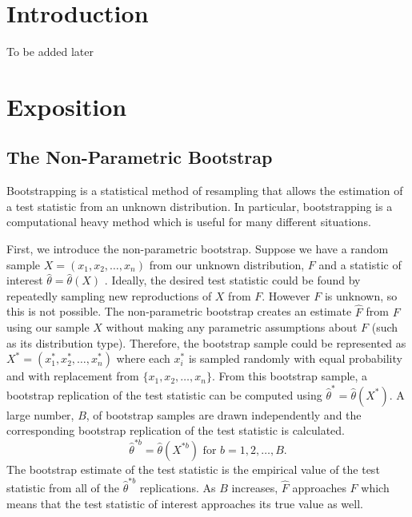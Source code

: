 \documentclass[12pt]{article}
\begin{document}
\newpage
{} %

\hypertarget{introduction}{%
\section{Introduction}\label{introduction}}

To be added later

\hypertarget{exposition}{%
\section{Exposition}\label{exposition}}

\hypertarget{the-non-parametric-bootstrap}{%
\subsection{The Non-Parametric
Bootstrap}\label{the-non-parametric-bootstrap}}

Bootstrapping is a statistical method of resampling that allows the
estimation of a test statistic from an unknown distribution. In
particular, bootstrapping is a computational heavy method which is
useful for many different situations.

First, we introduce the non-parametric bootstrap. Suppose we have a
random sample \(X = (x_1,x_2,\dots,x_n)\) from our unknown distribution,
\(F\) and a statistic of interest \(\hat{\theta} = \hat{\theta}(X)\)
\citep{EfronCasi}. Ideally, the desired test statistic could be found by
repeatedly sampling new reproductions of \(X\) from \(F\). However \(F\)
is unknown, so this is not possible. The non-parametric bootstrap
creates an estimate \(\hat{F}\) from \(F\) using our sample \(X\)
without making any parametric assumptions about \(F\) (such as its
distribution type). Therefore, the bootstrap sample could be represented
as \(X^* = (x^*_1, x^*_2, \dots, x^*_n)\) where each \(x^*_i\) is
sampled randomly with equal probability and with replacement from
\(\{x_1,x_2,\dots,x_n\}\). From this bootstrap sample, a bootstrap
replication of the test statistic can be computed using
\(\hat{\theta}^* = \hat{\theta}(X^*)\). A large number, \(B\), of
bootstrap samples are drawn independently and the corresponding
bootstrap replication of the test statistic is calculated.
\[\hat{\theta}^{*b} = \hat{\theta}(X^{*b}) \text{ for } b = 1,2, \dots, B.\]
The bootstrap estimate of the test statistic is the empirical value of
the test statistic from all of the \(\hat{\theta}^{*b}\) replications.
As \(B\) increases, \(\hat{F}\) approaches \(F\) which means that the
test statistic of interest approaches its true value as well.
\end{document}

